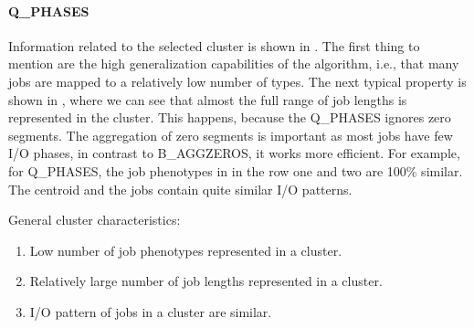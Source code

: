 \documentclass{jhps}
\begin{document}
\FloatBarrier
\paragraph{Q\_PHASES}
Information related to the selected cluster is shown in .
The first thing to mention are the high generalization capabilities of the algorithm, i.e., that many jobs are mapped to a relatively low number of types.
The next typical property is shown in , where we can see that almost the full range of job lengths is represented in the cluster.
This happens, because the Q\_PHASES ignores zero segments.
The aggregation of zero segments is important as most jobs have few I/O phases, in contrast to B\_AGGZEROS, it works more efficient.
For example, for Q\_PHASES, the job phenotypes in  in the row one and two are 100$\%$ similar.
The centroid and the jobs contain quite similar I/O patterns.

General cluster characteristics:
\begin{enumerate}
 \item Low number of job phenotypes represented in a cluster.
 \item Relatively large number of job lengths represented in a cluster.
 \item I/O pattern of jobs in a cluster are similar.
\end{enumerate}
\end{document}
